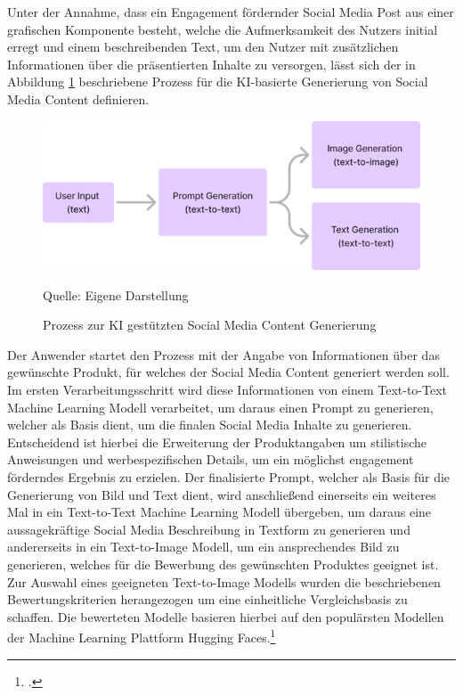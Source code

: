 Unter der Annahme, dass ein Engagement fördernder Social Media Post aus einer grafischen Komponente besteht, welche die Aufmerksamkeit des Nutzers initial erregt und einem beschreibenden Text, um den Nutzer mit zusätzlichen Informationen über die präsentierten Inhalte zu versorgen, lässt sich der in Abbildung \ref{fig:process_content_generation} beschriebene Prozess für die KI-basierte Generierung von Social Media Content definieren.
\begin{figure}[H]
    \centering
    \includegraphics[width=\textwidth]{abbildungen/Process_image_generation}
    \caption{Prozess zur KI gestützten Social Media Content Generierung}
    \label{fig:process_content_generation}
    \raggedright Quelle: Eigene Darstellung
\end{figure}

Der Anwender startet den Prozess mit der Angabe von Informationen über das gewünschte Produkt, für welches der Social Media Content generiert werden soll.
Im ersten Verarbeitungsschritt wird diese Informationen von einem Text-to-Text Machine Learning Modell verarbeitet, um daraus einen Prompt zu generieren, welcher als Basis dient, um die finalen Social Media Inhalte zu generieren.
Entscheidend ist hierbei die Erweiterung der Produktangaben um stilistische Anweisungen und werbespezifischen Details, um ein möglichst engagement förderndes Ergebnis zu erzielen.
Der finalisierte Prompt, welcher als Basis für die Generierung von Bild und Text dient, wird anschließend einerseits ein weiteres Mal in ein Text-to-Text Machine Learning Modell übergeben, um daraus eine aussagekräftige Social Media Beschreibung in Textform zu generieren und andererseits in ein Text-to-Image Modell, um ein ansprechendes Bild zu generieren, welches für die Bewerbung des gewünschten Produktes geeignet ist.
Zur Auswahl eines geeigneten Text-to-Image Modells wurden die beschriebenen Bewertungskriterien herangezogen um eine einheitliche Vergleichsbasis zu schaffen.
Die bewerteten Modelle basieren hierbei auf den populärsten Modellen der Machine Learning Plattform Hugging Faces.\footcite{huggingface_models}

